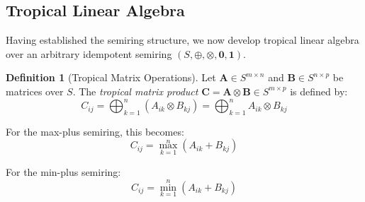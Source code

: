 \documentclass[11pt,a4paper]{article}
\theoremstyle{plain}
\theoremstyle{definition}
\newtheorem{definition}[theorem]{Definition}
\newcommand{\mat}[1]{\mathbf{#1}}
\begin{document}
\subsection{Tropical Linear Algebra}
\label{subsec:tropical-linear-algebra}

Having established the semiring structure, we now develop tropical linear algebra over an arbitrary idempotent semiring $(S, \oplus, \otimes, \mathbf{0}, \mathbf{1})$.

\begin{definition}[Tropical Matrix Operations]
Let $\mat{A} \in S^{m \times n}$ and $\mat{B} \in S^{n \times p}$ be matrices over $S$. The \emph{tropical matrix product} $\mat{C} = \mat{A} \otimes \mat{B} \in S^{m \times p}$ is defined by:
\begin{equation}
    C_{ij} = \bigoplus_{k=1}^{n} (A_{ik} \otimes B_{kj}) = \bigoplus_{k=1}^{n} A_{ik} \otimes B_{kj}
\end{equation}
\end{definition}

For the max-plus semiring, this becomes:
\begin{equation}
    C_{ij} = \max_{k=1}^{n} (A_{ik} + B_{kj})
\end{equation}

For the min-plus semiring:
\begin{equation}
    C_{ij} = \min_{k=1}^{n} (A_{ik} + B_{kj})
\end{equation}
\end{document}
